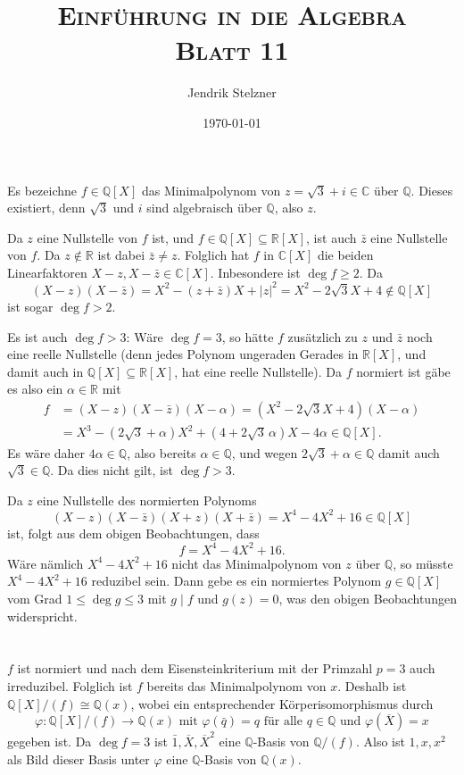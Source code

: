 \documentclass[a4paper,10pt]{article}
\title{\textsc{Einführung in die Algebra \\ \Large Blatt 11}}
\author{Jendrik Stelzner}
\date{\today}
\theoremstyle{definition}
\newcommand{\Q}{\mathbb{Q}}
\newcommand{\R}{\mathbb{R}}
\newcommand{\C}{\mathbb{C}}
\begin{document}
\maketitle





\section{}
Es bezeichne $f \in \Q[X]$ das Minimalpolynom von $z = \sqrt{3}+i \in \C$ über $\Q$. Dieses existiert, denn $\sqrt{3}$ und $i$ sind algebraisch über $\Q$, also $z$.

Da $z$ eine Nullstelle von $f$ ist, und $f \in \Q[X] \subseteq \R[X]$, ist auch $\bar{z}$ eine Nullstelle von $f$. Da $z \not\in \R$ ist dabei $\bar{z} \neq z$. Folglich hat $f$ in $\C[X]$ die beiden Linearfaktoren $X-z, X-\bar{z} \in \C[X]$. Inbesondere ist $\deg f \geq 2$. Da
\[
 (X-z)(X-\bar{z}) = X^2 -(z+\bar{z})X + |z|^2 = X^2 -2\sqrt{3}X + 4 \not\in \Q[X]
\]
ist sogar $\deg f > 2$.

Es ist auch $\deg f > 3$: Wäre $\deg f = 3$, so hätte $f$ zusätzlich zu $z$ und $\bar{z}$ noch eine reelle Nullstelle (denn jedes Polynom ungeraden Gerades in $\R[X]$, und damit auch in $\Q[X] \subseteq \R[X]$, hat eine reelle Nullstelle). Da $f$ normiert ist gäbe es also ein $\alpha \in \R$ mit
\begin{align*}
 f &= (X-z)(X-\bar{z})(X-\alpha) = (X^2 -2\sqrt{3}X + 4)(X-\alpha) \\
   &= X^3 - (2\sqrt{3}+\alpha)X^2 + (4+2\sqrt{3}\,\alpha)X -4\alpha \in \Q[X].
\end{align*}
Es wäre daher $4\alpha \in \Q$, also bereits $\alpha \in \Q$, und wegen $2\sqrt{3} + \alpha \in \Q$ damit auch $\sqrt{3} \in \Q$. Da dies nicht gilt, ist $\deg f > 3$.

Da $z$ eine Nullstelle des normierten Polynoms
\[
 (X-z)(X-\bar{z})(X+z)(X+\bar{z})
 = X^4 -4X^2 + 16 \in \Q[X]
\]
ist, folgt aus dem obigen Beobachtungen, dass
\[
 f = X^4 -4X^2 + 16.
\]
Wäre nämlich $X^4 -4X^2 + 16$ nicht das Minimalpolynom von $z$ über $\Q$, so müsste $X^4 -4X^2 + 16$ reduzibel sein. Dann gebe es ein normiertes Polynom $g \in \Q[X]$ vom Grad $1 \leq \deg g \leq 3$ mit $g \mid f$ und $g(z) = 0$, was den obigen Beobachtungen widerspricht.





\section{}
$f$ ist normiert und nach dem Eisensteinkriterium mit der Primzahl $p = 3$ auch irreduzibel. Folglich ist $f$ bereits das Minimalpolynom von $x$. Deshalb ist $\Q[X]/(f) \cong \Q(x)$, wobei ein entsprechender Körperisomorphismus durch
\[
 \varphi: \Q[X]/(f) \rightarrow \Q(x) \text{ mit }
 \varphi(\bar{q}) = q \text{ für alle } q \in \Q \text{ und }
 \varphi\left(\overline{X}\right) = x
\]
gegeben ist. Da $\deg f = 3$ ist $\bar{1}, \overline{X}, \overline{X}^2$ eine $\Q$-Basis von $\Q/(f)$. Also ist $1, x, x^2$ als Bild dieser Basis unter $\varphi$ eine $\Q$-Basis von $\Q(x)$.
\end{document}
